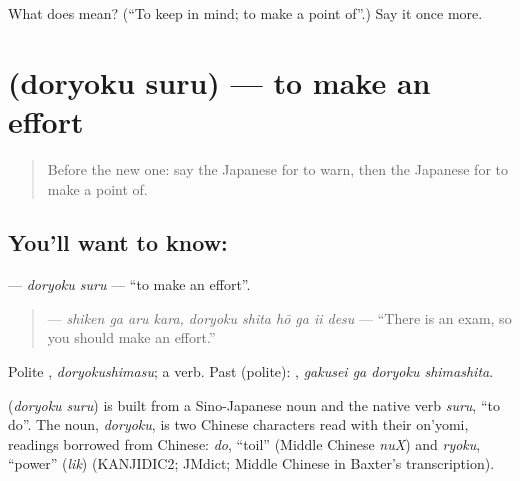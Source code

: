 \begin{tcolorbox}[breakable,colback=teal!4,colframe=teal!35!black,title={Before you move on}]
What does  mean? (\textquotedblleft{}To keep in mind; to make a point of\textquotedblright{}.) Say it once more.
\end{tcolorbox}
\section[\texorpdfstring{\ja{どりょくする} (doryoku suru)}{どりょくする (doryoku suru)}]{ (doryoku suru) — to make an effort}

\label{lesson:JA-C340-doryoku-suru}



\begin{quote}
Before the new one: say the Japanese for to warn, then the Japanese for to make a point of.
\end{quote}

\subsection*{You'll want to know: }
\textbf{} — \emph{doryoku suru} — \textquotedblleft{}to make an effort\textquotedblright{}.

\begin{quote}
\textbf{   } — \emph{shiken ga aru kara, doryoku shita hō ga ii desu} — \textquotedblleft{}There is an exam, so you should make an effort.\textquotedblright{}
\end{quote}

Polite \textbf{}, \emph{doryokushimasu}; a  verb. Past (polite): \textbf{ }, \emph{gakusei ga doryoku shimashita}.

\begin{cousinweb}
\textbf{} (\emph{doryoku suru}) is built from a Sino-Japanese noun and the native verb \emph{suru}, \textquotedblleft{}to do\textquotedblright{}. The noun, \emph{doryoku}, is two Chinese characters read with their on'yomi, readings borrowed from Chinese: \emph{do}, \textquotedblleft{}toil\textquotedblright{} (Middle Chinese \emph{nuX}) and \emph{ryoku}, \textquotedblleft{}power\textquotedblright{} (\emph{lik}) (KANJIDIC2; JMdict; Middle Chinese in Baxter's transcription).
\end{cousinweb}

